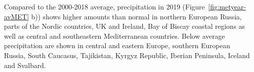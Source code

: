 Compared to the 2000-2018 average, precipitation in 2019 (Figure~\ref{fig:metyear-avMET} b)) shows higher amounts than normal in northern European Russia, parts of the Nordic countries, UK and Ireland, Bay of Biscay coastal regions as well as central and southeastern Mediterranean countries. Below average precipitation are shown in central and eastern Europe, southern European Russia, South Caucasus, Tajikistan, Kyrgyz Republic, Iberian Peninsula, Iceland and Svalbard.

\begin{figure}[h]
  \centering 

\end{figure}
